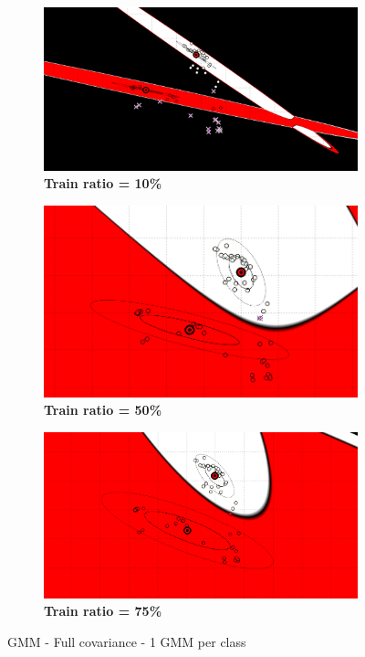 \begin{figure} [ht]
\centering
	\begin{subfigure}[h]{0.32\textwidth}
    \centering
	\includegraphics[height=0.08\textheight]{./classification/full_var_gmm_1_10pourcent_test.png}
	\caption{\bf Train ratio = 10\%}
	\end{subfigure}
    \begin{subfigure}[h]{0.32\textwidth}
    \centering
    \includegraphics[height=0.08\textheight]{./classification/full_var_gmm_1_50pourcent_test.png}
	\caption{\bf Train ratio = 50\%}
    \end{subfigure}
    \begin{subfigure}[h]{0.32\textwidth}
    \centering
    \includegraphics[height=0.08\textheight]{./classification/full_var_gmm_1_75pourcent_test.png}
	\caption{\bf Train ratio = 75\%}
    \end{subfigure}

\caption{GMM - Full covariance - 1 GMM per class}
\label{fig:train_ratio}
\end{figure}

